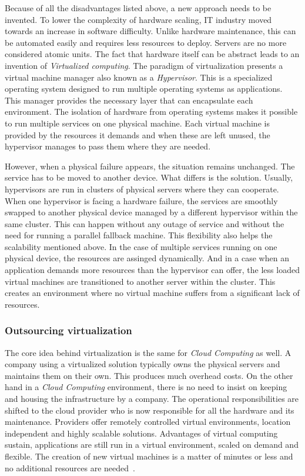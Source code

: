 Because of all the disadvantages listed above, a new approach needs to be invented. To lower the complexity of hardware scaling, IT industry moved towards an increase in software difficulty. Unlike hardware maintenance, this can be automated easily and requires less resources to deploy. Servers are no more considered atomic units. The fact that hardware itself can be abstract leads to an invention of \emph{Virtualized computing}. The paradigm of virtualization presents a virtual machine manager also known as a \emph{Hypervisor}. This is a specialized operating system designed to run multiple operating systems as applications. This manager provides the necessary layer that can encapsulate each environment. The isolation of hardware from operating systems makes it possible to run multiple services on one physical machine. Each virtual machine is provided by the resources it demands and when these are left unused, the hypervisor manages to pass them where they are needed.

However, when a physical failure appears, the situation remains unchanged. The service has to be moved to another device. What differs is the solution. Usually, hypervisors are run in clusters of physical servers where they can cooperate. When one hypervisor is facing a hardware failure, the services are smoothly swapped to another physical device managed by a different hypervisor within the same cluster. This can happen without any outage of service and without the need for running a parallel fallback machine. This flexibility also helps the scalability mentioned above. In the case of multiple services running on one physical device, the resources are assinged dynamically. And in a case when an application demands more resources than the hypervisor can offer, the less loaded virtual machines are transitioned to another server within the cluster. This creates an environment where no virtual machine suffers from a significant lack of resources.

\subsubsection{Outsourcing virtualization}
\label{subs:Outsourcing virtualization}

The core idea behind virtualization is the same for \emph{Cloud Computing} as well. A company using a virtualized solution typically owns the physical servers and maintains them on their own. This produces much overhead costs. On the other hand in a \emph{Cloud Computing} environment, there is no need to insist on keeping and housing the infrastructure by a company. The operational responsibilities are shifted to the cloud provider who is now responsible for all the hardware and its maintenance. Providers offer remotely controlled virtual environments, location independent and highly scalable solutions. Advantages of virtual computing sustain, applications are still run in a virtual environment, scaled on demand and flexible. The creation of new virtual machines is a matter of minutes or less and no additional resources are needed~\cite{aws}.

